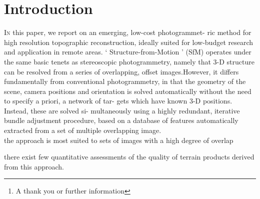 \documentclass[twoside,twocolumn]{article}
\title{\citetitle{westoby_structure--motion_2012}} %
\author{%
\textsc{Virgile Daugé}\thanks{A thank you or further information} \\[1ex] %
\normalsize University of Lorraine \\ %
\normalsize \href{mailto:virgile.dauge@inria.fr}{virgile.dauge@inria.fr} %
}
\date{\today} %
\begin{document}
\maketitle


\section{Introduction}

\lettrine[nindent=0em,lines=3]{I}n this paper, we report on an emerging, low-cost photogrammet-
ric method for high resolution topographic reconstruction, ideally
suited for low-budget research and application in remote areas.
‘
Structure-from-Motion
’
(SfM) operates under the same basic tenets
as stereoscopic photogrammetry, namely that 3-D structure can be
resolved from a series of overlapping, offset images.However,
it differs fundamentally from conventional photogrammetry, in that
the geometry of the scene, camera positions and orientation is solved
automatically without the need to specify a priori, a network of tar-
gets which have known 3-D positions. Instead, these are solved si-
multaneously using a highly redundant, iterative bundle adjustment
procedure, based on a database of features automatically extracted
from a set of multiple overlapping image. \\
the approach is most suited to sets of images with a
high degree of overlap

there exist few quantitative assessments of the quality of terrain
products derived from this approach.
\blindtext

\end{document}
